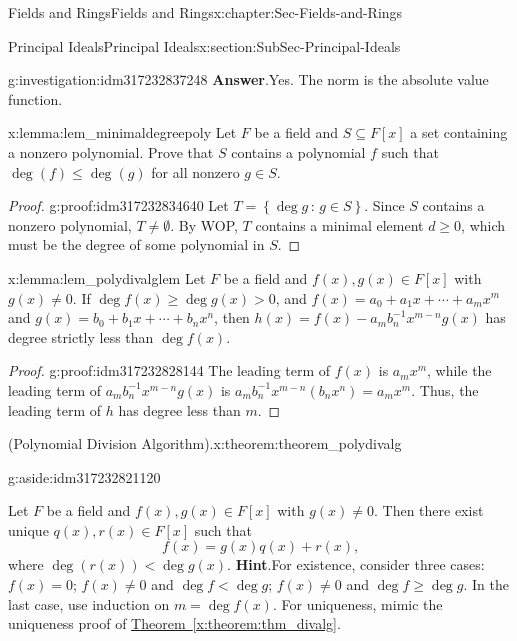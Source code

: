 \documentclass[oneside,10pt,]{book}
\newcommand{\blocktitlefont}{\relax}
\newcommand{\xreffont}{\relax}
\numberwithin{equation}{section}
\renewcommand{\le}{\leqslant}
\renewcommand{\ge}{\geqslant}
\newcommand{\setof}[2]{{\left\{#1\,\colon\,#2\right\}}}
\newcommand{\lt}{<}
\begin{document}
\begin{chapterptx}{Fields and Rings}{}{Fields and Rings}{}{}{x:chapter:Sec-Fields-and-Rings}
\begin{sectionptx}{Principal Ideals}{}{Principal Ideals}{}{}{x:section:SubSec-Principal-Ideals}
\begin{investigation}{}{g:investigation:idm317232837248}
\noindent\textbf{\blocktitlefont Answer}.\hypertarget{g:answer:idm317232835808}{}\quad{}Yes. The norm is the absolute value function.%
\end{investigation}
\begin{lemma}{}{}{x:lemma:lem_minimaldegreepoly}%
Let \(F\) be a field and \(S\subseteq F[x]\) a set containing a nonzero polynomial. Prove that \(S\) contains a polynomial \(f\) such that \(\deg(f) \le \deg(g)\) for all nonzero \(g\in S\).%
\end{lemma}
\begin{proof}{}{g:proof:idm317232834640}
Let \(T = \setof{\deg g}{g\in S}\). Since \(S\) contains a nonzero polynomial, \(T\ne \emptyset\). By WOP, \(T\) contains a minimal element \(d \ge 0\), which must be the degree of some polynomial in \(S\).%
\end{proof}
\begin{lemma}{}{}{x:lemma:lem_polydivalglem}%
Let \(F\) be a field and \(f(x),g(x)\in F[x]\) with \(g(x)\ne 0\). If \(\deg f(x) \ge \deg g(x) > 0\), and \(f(x) = a_0 + a_1 x + \cdots + a_m x^m\) and \(g(x) = b_0 + b_1 x + \cdots + b_n x^n\), then \(h(x) = f(x) - a_m b_n^{-1} x^{m-n} g(x)\) has degree strictly less than \(\deg f(x)\).%
\end{lemma}
\begin{proof}{}{g:proof:idm317232828144}
The leading term of \(f(x)\) is \(a_m x^m\), while the leading term of \(a_m b_n^{-1} x^{m-n} g(x)\) is \(a_m b_n^{-1} x^{m-n} (b_n x^n) = a_m x^m\). Thus, the leading term of \(h\) has degree less than \(m\).%
\end{proof}
\begin{theorem}{(Polynomial Division Algorithm).}{}{x:theorem:theorem_polydivalg}%
\begin{aside}{}{g:aside:idm317232821120}%
\end{aside}
Let \(F\) be a field and \(f(x),g(x)\in F[x]\) with \(g(x)\ne 0\). Then there exist unique \(q(x),
r(x) \in F[x]\) such that%
\begin{equation*}
f(x) = g(x) q(x) + r(x)\text{,}
\end{equation*}
where \(\deg(r(x)) \lt  \deg g(x)\).%
\textbf{\blocktitlefont Hint}.\quad{}For existence, consider three cases: \(f(x) = 0\); \(f(x) \ne 0\) and \(\deg f \lt \deg g\); \(f(x) \ne 0\) and \(\deg f \ge \deg g\). In the last case, use induction on \(m = \deg f(x)\). For uniqueness, mimic the uniqueness proof of \hyperref[x:theorem:thm_divalg]{Theorem~{\xreffont\ref{x:theorem:thm_divalg}}}.%
\end{theorem}

\end{sectionptx}
\end{chapterptx}
\end{document}
